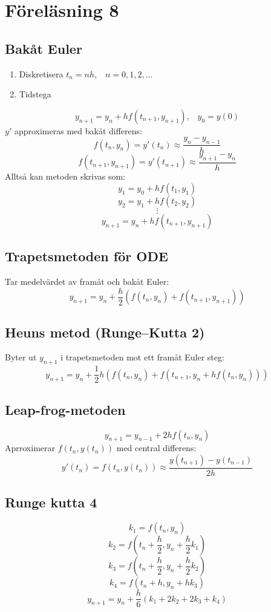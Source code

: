 \documentclass[a4paper,11pt]{article}
\begin{document}
\section{Föreläsning 8}
\subsection{Bakåt Euler}
\begin{enumerate}
    \item Diskretisera $t_n = nh, \hspace{10pt} n = 0, 1, 2, \ldots$
    \item Tidstega
\end{enumerate}
\[
y_{n+1} = y_n + hf(t_{n+1}, y_{n+1}), \hspace{10pt} y_0 = y(0)
\]
$y'$ approximeras med bakåt differens:
\[
f(t_n, y_n) = y'(t_n) \approx \frac{y_n - y_{n-1}}{h}
\]
\[
f(t_{n+1}, y_{n+1}) = y'(t_{n+1}) \approx \frac{y_{n+1} - y_n}{h}
\]
Alltså kan metoden skrivas som:
$$y_{1} = y_0 + hf(t_1, y_1)$$
$$y_{2} = y_1 + hf(t_2, y_2)$$
$$\vdots$$
$$y_{n+1} = y_n + hf(t_{n+1}, y_{n+1})$$

\subsection{Trapetsmetoden för ODE}
Tar medelvärdet av framåt och bakåt Euler:
\[
y_{n+1} = y_n + \frac{h}{2}(f(t_n, y_n) + f(t_{n+1}, y_{n+1}))
\]

\subsection{Heuns metod (Runge--Kutta 2)}
Byter ut $y_{n+1}$ i trapetsmetoden mot ett framåt Euler steg:
\[
y_{n+1} = y_n + \frac{1}{2}h(f(t_n, y_n) + f(t_{n+1}, y_n + hf(t_n, y_n)))
\]

\subsection{Leap-frog-metoden}
\[
y_{n+1} = y_{n-1} + 2hf(t_n, y_n)
\]
Aprroximerar $f(t_n, y(t_n))$ med central differens:
\[
y'(t_n) = f(t_n, y(t_n)) \approx \frac{y(t_{n+1}) - y(t_{n-1})}{2h}
\] 

\subsection{Runge kutta 4}
$$k_1 = f(t_n, y_n)$$
$$k_2 = f(t_n + \frac{h}{2}, y_n + \frac{h}{2}k_1)$$
$$k_3 = f(t_n + \frac{h}{2}, y_n + \frac{h}{2}k_2)$$
$$k_4 = f(t_n + h, y_n + hk_3)$$
$$y_{n+1} = y_n + \frac{h}{6}(k_1 + 2k_2 + 2k_3 + k_4)$$
\end{document}
